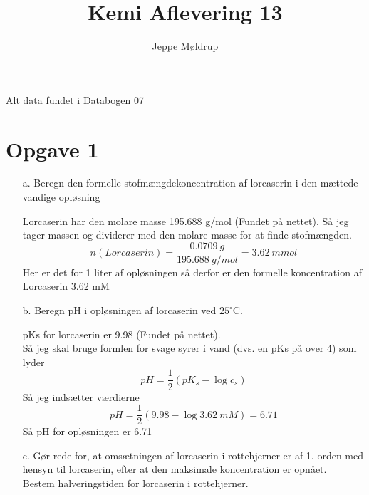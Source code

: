 \documentclass[12pt]{article}
\begin{document}
\title{Kemi Aflevering 13}
\author{Jeppe Møldrup}
\date{}

\maketitle{}

Alt data fundet i Databogen 07

\section*{Opgave 1}

\begin{enumerate}
        \item[a.] Beregn den formelle stofmængdekoncentration af lorcaserin i den mættede vandige opløsning

                Lorcaserin har den molare masse 195.688 g/mol (Fundet på nettet). Så jeg tager massen og dividerer
                med den molare masse for at finde stofmængden.
                $$n(Lorcaserin)=\frac{0.0709 \ g}{195.688 \ g/mol} = 3.62 \ mmol$$
                Her er det for 1 liter af opløsningen så derfor er den formelle koncentration af Lorcaserin 3.62 mM

        \item[b.] Beregn pH i opløsningen af lorcaserin ved $25^{\circ}$C.

                pKs for lorcaserin er 9.98 (Fundet på nettet).\\
                Så jeg skal bruge formlen for svage syrer i vand (dvs. en pKs på over 4) som lyder
                $$pH = \frac{1}{2}(pK_s-\log{c_s})$$
                Så jeg indsætter værdierne
                $$pH = \frac{1}{2}(9.98-\log{3.62 \ mM}) = 6.71$$
                Så pH for opløsningen er 6.71

        \item[c.] Gør rede for, at omsætningen af lorcaserin i rottehjerner er af 1. orden med hensyn til lorcaserin,
                efter at den maksimale koncentration er opnået.\\
                Bestem halveringstiden for lorcaserin i rottehjerner.

\end{enumerate}
\end{document}
